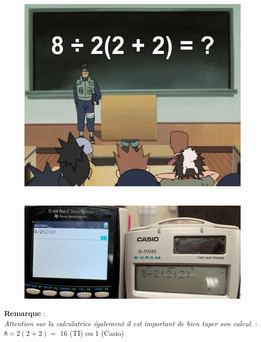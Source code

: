 \documentclass[11pt]{article}
\begin{document}
\begin{minipage}[t]{0.5\textwidth}
  \begin{figure}[H]
        \centering
        \includegraphics[width=0.7\linewidth]{5x1-calculer/naruto.png}
  \end{figure}
\end{minipage}
\begin{minipage}[t]{0.5\textwidth}
  \begin{figure}[H]
        \centering
        \includegraphics[width=\linewidth]{5x1-calculer/calc.png}
  \end{figure}
\end{minipage}



\textbf{Remarque} : \\
\textit{Attention sur la calculatrice également il est important de bien taper son calcul. } : $8 \div 2(2+2) =$ 16 (TI) ou 1 (Casio)
\end{document}
